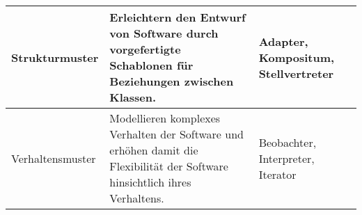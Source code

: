 \documentclass{bschlangaul-aufgabe}
\begin{document}
\begin{enumerate}
\begin{liAntwort}
\begin{tabularx}{\linewidth}{p{2cm}|X|p{2cm}}
Strukturmuster &
Erleichtern den Entwurf von Software durch vorgefertigte Schablonen für
Beziehungen zwischen Klassen. &
Adapter, Kompositum, Stellvertreter \\\hline

Verhaltensmuster  &
Modellieren komplexes Verhalten der Software und erhöhen damit die
Flexibilität der Software hinsichtlich ihres Verhaltens. &
Beobachter, Interpreter, Iterator \\
\end{tabularx}
\end{liAntwort}
\end{enumerate}
\end{document}
